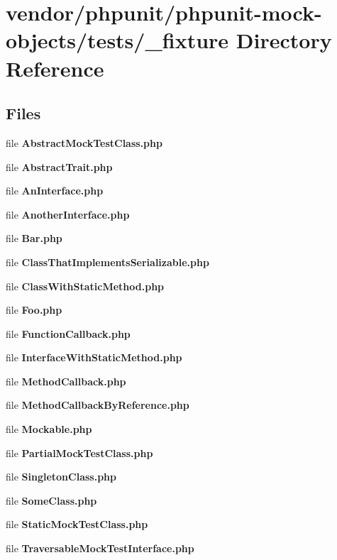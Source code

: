 \section{vendor/phpunit/phpunit-\/mock-\/objects/tests/\+\_\+fixture Directory Reference}
\label{dir_ebfa748c53b402f1909d8aa21a2909b5}
\subsection*{Files}
\begin{DoxyCompactItemize}
\item 
file {\bf Abstract\+Mock\+Test\+Class.\+php}
\item 
file {\bf Abstract\+Trait.\+php}
\item 
file {\bf An\+Interface.\+php}
\item 
file {\bf Another\+Interface.\+php}
\item 
file {\bf Bar.\+php}
\item 
file {\bf Class\+That\+Implements\+Serializable.\+php}
\item 
file {\bf Class\+With\+Static\+Method.\+php}
\item 
file {\bf Foo.\+php}
\item 
file {\bf Function\+Callback.\+php}
\item 
file {\bf Interface\+With\+Static\+Method.\+php}
\item 
file {\bf Method\+Callback.\+php}
\item 
file {\bf Method\+Callback\+By\+Reference.\+php}
\item 
file {\bf Mockable.\+php}
\item 
file {\bf Partial\+Mock\+Test\+Class.\+php}
\item 
file {\bf Singleton\+Class.\+php}
\item 
file {\bf Some\+Class.\+php}
\item 
file {\bf Static\+Mock\+Test\+Class.\+php}
\item 
file {\bf Traversable\+Mock\+Test\+Interface.\+php}
\end{DoxyCompactItemize}
